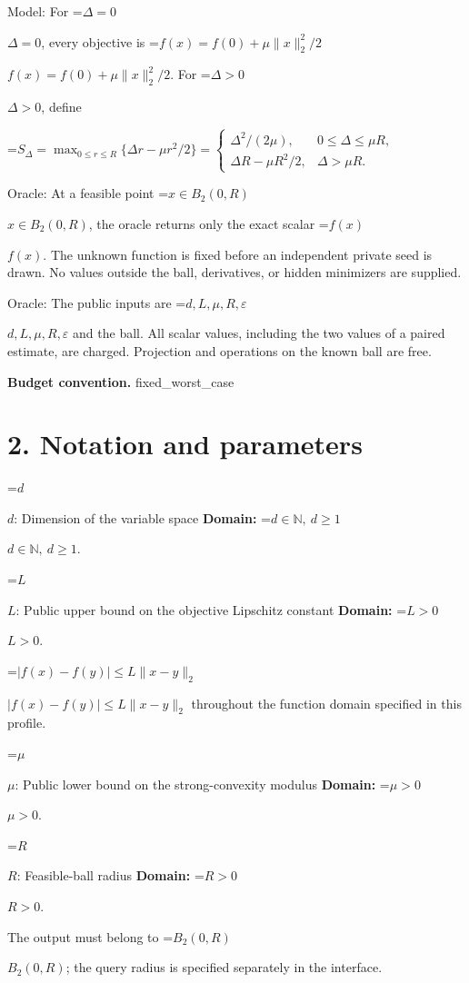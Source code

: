 \documentclass[10pt,a4paper]{article}
\newcommand{\AtlasMath}[1]{\par\begingroup\centering\setbox0=\hbox{$\displaystyle #1$}\ifdim\wd0>1.4\linewidth\typeout{ATLAS WIDE FORMULA: \the\wd0}\fi\ifdim\wd0>\linewidth\resizebox{\linewidth}{!}{\box0}\else\box0\fi\par\endgroup}
\newcommand{\AtlasInlineMath}[1]{\begingroup\setbox0=\hbox{$#1$}\ifdim\wd0>.4\linewidth\endgroup\AtlasMath{#1}\else\endgroup$#1$\fi}
\begin{document}
Model: For \AtlasInlineMath{\Delta=0}, every objective is \AtlasInlineMath{f(x)=f(0)+\mu\|x\|_2^2/2}. For \AtlasInlineMath{\Delta>0}, define
\AtlasMath{S_\Delta=\max_{0\le r\le R}\{\Delta r-\mu r^2/2\}=\begin{cases}\Delta^2/(2\mu),&0\le\Delta\le\mu R,\\ \Delta R-\mu R^2/2,&\Delta>\mu R.\end{cases}}




Oracle: At a feasible point \AtlasInlineMath{x\in B_2(0,R)}, the oracle returns only the exact scalar \AtlasInlineMath{f(x)}. The unknown function is fixed before an independent private seed is drawn. No values outside the ball, derivatives, or hidden minimizers are supplied.



Oracle: The public inputs are \AtlasInlineMath{d,L,\mu,R,\varepsilon} and the ball. All scalar values, including the two values of a paired estimate, are charged. Projection and operations on the known ball are free.



\textbf{Budget convention.} fixed\_worst\_case



\section{2. Notation and parameters}


\AtlasInlineMath{d}: Dimension of the variable space \textbf{Domain:} \AtlasInlineMath{d\in\mathbb{N},\ d\ge1}.



\AtlasInlineMath{L}: Public upper bound on the objective Lipschitz constant \textbf{Domain:} \AtlasInlineMath{L>0}.



\AtlasInlineMath{|f(x)-f(y)|\le L\|x-y\|_2} throughout the function domain specified in this profile.



\AtlasInlineMath{\mu}: Public lower bound on the strong-convexity modulus \textbf{Domain:} \AtlasInlineMath{\mu>0}.



\AtlasInlineMath{R}: Feasible-ball radius \textbf{Domain:} \AtlasInlineMath{R>0}.



The output must belong to \AtlasInlineMath{B_2(0,R)}; the query radius is specified separately in the interface.
\end{document}
